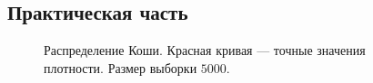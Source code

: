 \documentclass[12pt, a4paper]{article}
\begin{document}
\subsection{Практическая часть}
\begin{figure}[H]
\caption{Распределение Коши. Красная кривая --- точные значения плотности. Размер выборки $5000$.}
\end{figure}
\end{document}
